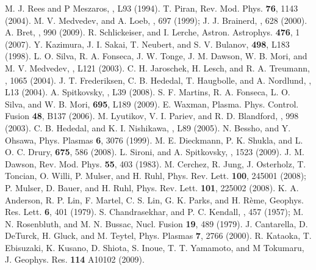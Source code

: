 \documentclass[twocolumn,showpacs,preprintnumbers,amsmath,amssymb]{revtex4}
\begin{document}
\begin{thebibliography}{99}
 M. J. Rees and P Meszaros, , L93 (1994).
 T. Piran, Rev. Mod. Phys. {\bf 76}, 1143 (2004).
 M. V. Medvedev, and A. Loeb, , 697 (1999); J. J. Brainerd, 
, 628 (2000). 
 A. Bret, , 990 (2009).
 R. Schlickeiser, and I. Lerche, Astron. Astrophys. {\bf 476}, 1 (2007).
 Y. Kazimura, J. I. Sakai, T. Neubert, and S. V. Bulanov, \apj
{\bf 498}, L183 (1998).
 L. O. Silva, R. A. Fonseca, J. W. Tonge, J. M. Dawson, W. B. Mori, 
and M. V. Medvedev, , L121 (2003).
 C. H. Jaroschek, H. Lesch, and R. A. Treumann, ,
1065 (2004).
 J. T. Frederiksen, C. B. Hededal, T. Haugbolle, and A. Nordlund,
, L13 (2004).
 A. Spitkovsky, , L39 (2008). 
 S. F. Martins, R. A. Fonseca, L. O. Silva, and W. B. Mori, \apj
{\bf 695}, L189 (2009). 
 E. Waxman, Plasma. Phys. Control. Fusion {\bf 48}, B137 (2006).
 M. Lyutikov, V. I. Pariev, and R. D. Blandford, ,
998 (2003).
 C. B. Hededal, and K. I. Nishikawa, , L89 (2005).
 N. Bessho, and Y. Ohsawa, Phys. Plasmas {\bf 6}, 3076 (1999). 
 M. E. Dieckmann, P. K. Shukla, and L. O. C. Drury, \apj 
{\bf 675}, 586 (2008).
 L. Sironi, and A. Spitkovsky, , 1523 (2009).
 J. M. Dawson, Rev. Mod. Phys. {\bf 55}, 403 (1983).
 M. Cerchez, R. Jung, J. Osterholz, T. Toncian, O. Willi, P. Mulser, and
H. Ruhl, Phys. Rev. Lett. {\bf 100}, 245001 (2008); P. Mulser, D. Bauer, and H. Ruhl,
Phys. Rev. Lett. {\bf 101}, 225002 (2008). 
 K. A. Anderson, R. P. Lin, F. Martel, C. S. Lin, G. K. Parks, and H. R\`eme,
Geophys. Res. Lett. {\bf 6}, 401 (1979).
 S. Chandrasekhar, and P. C. Kendall, , 457 (1957); M. N. Rosenbluth, 
and M. N. Bussac, Nucl. Fusion {\bf 19}, 489 (1979).
 J. Cantarella, D. DeTurck, H. Gluck, and M. Teytel, Phys. Plasmas {\bf 7}, 2766 (2000).
 R. Kataoka, T. Ebisuzaki, K. Kusano, D. Shiota, S. Inoue, T. T. Yamamoto, and M 
Tokumaru, J. Geophys. Res. {\bf 114} A10102 (2009).
\end{thebibliography}
\end{document}

